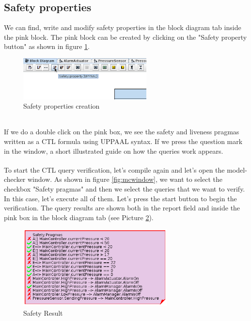 \documentclass[12pt]{article}
\begin{document}
\subsection{Safety properties}
We can find, write and modify safety properties in the block diagram tab inside the pink block. The pink block can be created by clicking on the "Safety property button" as shown in figure \ref{fig:safety}.
\begin{figure}[h!]
\centering
\includegraphics[width=0.6\textwidth]{images/safety.png}
\caption{Safety properties creation}
\label{fig:safety}
\end{figure}
\\If we do a double click on the pink box, we see the safety and liveness pragmas written as a CTL formula using UPPAAL syntax. If we press the question mark in the window, a short illustrated guide on how the queries work appears.
\\\\
To start the CTL query verification, let's compile again and let's open the model-checker window. As shown in figure \ref{fig:mcwindow}, we want to select the checkbox "Safety pragmas" and then we select the queries that we want to verify. In this case, let's execute all of them. Let's press the start button to begin the verification. The query results are shown both in the report field and inside the pink box in the block diagram tab (see Picture \ref{fig:sresult}).
\begin{figure}[h!]
\centering
\includegraphics[width=0.7\textwidth]{images/safety_result.png}
\caption{Safety Result}
\label{fig:sresult}
\end{figure}\\\\
\end{document}
